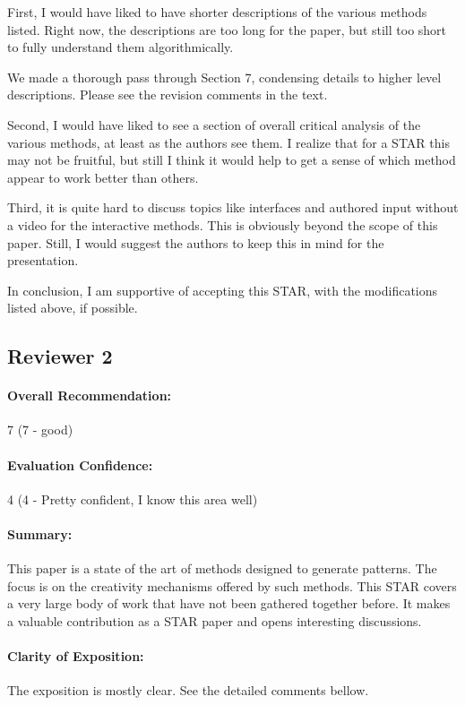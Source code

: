 \documentclass{egpubl}
\newcommand{\rev}[2]{{\color{greenrev}\textsuperscript{#1}#2}}
\renewcommand{\rev}[2]{{#2}}
\begin{document}
First, I would have liked to have shorter descriptions of the various methods listed. Right now, the descriptions are too long for the paper, but still too short to fully understand them algorithmically.

\rev{Comment}{We made a thorough pass through Section 7, condensing details to higher level descriptions. Please see the revision comments in the text.}

Second, I would have liked to see a section of overall critical analysis of the various methods, at least as the authors see them. I realize that for a STAR this may not be fruitful, but still I think it would help to get a sense of which method appear to work better than others.

Third, it is quite hard to discuss topics like interfaces and authored input without a video for the interactive methods. This is obviously beyond the scope of this paper. Still, I would suggest the authors to keep this in mind for the presentation.

In conclusion, I am supportive of accepting this STAR, with the modifications listed above, if possible.


\rev{Comments}{}

\subsection*{Reviewer 2}

\paragraph*{Overall Recommendation:} 7 (7 - good)
\paragraph*{Evaluation Confidence:} 4 (4 - Pretty confident, I know this area well)
\paragraph*{Summary:} This paper is a state of the art of methods designed to generate patterns. The focus is on the creativity mechanisms offered by such methods.
This STAR covers a very large body of work that have not been gathered together before. It makes a valuable contribution as a STAR paper and opens interesting discussions. 
\paragraph*{Clarity of Exposition:} The exposition is mostly clear. See the detailed comments bellow.
\end{document}
